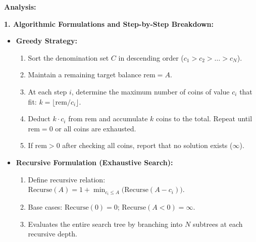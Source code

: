 \documentclass[12pt]{article}
\begin{document}
\newpage

\textbf{Analysis:}

\textbf{1. Algorithmic Formulations and Step-by-Step Breakdown:}

\begin{itemize}
    \item \textbf{Greedy Strategy:}
    \begin{enumerate}
        \item Sort the denomination set $C$ in descending order ($c_1 > c_2 > \dots > c_N$).
        \item Maintain a remaining target balance $\text{rem} = A$.
        \item At each step $i$, determine the maximum number of coins of value $c_i$ that fit: $k = \lfloor \text{rem} / c_i \rfloor$.
        \item Deduct $k \cdot c_i$ from $\text{rem}$ and accumulate $k$ coins to the total. Repeat until $\text{rem} = 0$ or all coins are exhausted.
        \item If $\text{rem} > 0$ after checking all coins, report that no solution exists ($\infty$).
    \end{enumerate}

    \item \textbf{Recursive Formulation (Exhaustive Search):}
    \begin{enumerate}
        \item Define recursive relation: $\text{Recurse}(A) = 1 + \min_{c_i \le A} \big(\text{Recurse}(A - c_i)\big)$.
        \item Base cases: $\text{Recurse}(0) = 0$; $\text{Recurse}(A < 0) = \infty$.
        \item Evaluates the entire search tree by branching into $N$ subtrees at each recursive depth.
    \end{enumerate}


\end{itemize}
\end{document}
